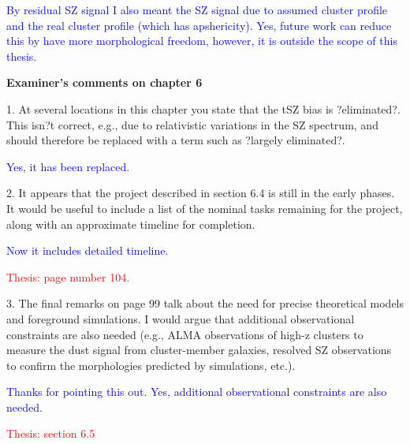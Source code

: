 \documentclass[11pt,a4paper]{article}
\begin{document}
\textcolor{blue}{By residual SZ signal I also meant the SZ signal due to assumed cluster profile and the real cluster profile (which has apshericity). Yes, future work can reduce this by have more morphological freedom, however, it is outside the scope of this thesis.}





\begin{center}
\textbf{Examiner's comments on chapter 6}
\end{center}

1. At several locations in this chapter you state that the tSZ bias is ?eliminated?. This
isn?t correct, e.g., due to relativistic variations in the SZ spectrum, and should
therefore be replaced with a term such as ?largely eliminated?.

\textcolor{blue}{Yes, it has been replaced.}

2. It appears that the project described in section 6.4 is still in the early phases. It
would be useful to include a list of the nominal tasks remaining for the project,
along with an approximate timeline for completion.

\textcolor{blue}{Now it includes detailed timeline.}

\textcolor{red}{Thesis: page number 104.}

3. The final remarks on page 99 talk about the need for precise theoretical models
and foreground simulations. I would argue that additional observational
constraints are also needed (e.g., ALMA observations of high-z clusters to
measure the dust signal from cluster-member galaxies, resolved SZ observations
to confirm the morphologies predicted by simulations, etc.).

\textcolor{blue}{Thanks for pointing this out. Yes, additional observational constraints are also needed. }

\textcolor{red}{Thesis: section 6.5}
\end{document}
